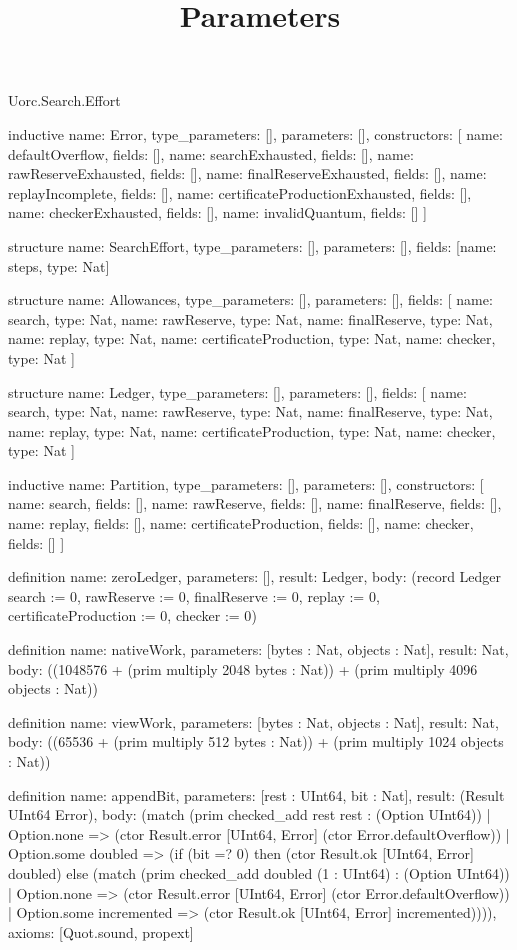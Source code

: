 \begin{lexlean}{Uorc.Search.Effort}
\title{Parameters}
\begin{semanticmodule}
inductive{
  name: Error,
  type_parameters: [],
  parameters: [],
  constructors: [
    {name: defaultOverflow, fields: []},
    {name: searchExhausted, fields: []},
    {name: rawReserveExhausted, fields: []},
    {name: finalReserveExhausted, fields: []},
    {name: replayIncomplete, fields: []},
    {name: certificateProductionExhausted, fields: []},
    {name: checkerExhausted, fields: []},
    {name: invalidQuantum, fields: []}
  ]
}

structure{
  name: SearchEffort,
  type_parameters: [],
  parameters: [],
  fields: [{name: steps, type: Nat}]
}

structure{
  name: Allowances,
  type_parameters: [],
  parameters: [],
  fields: [
    {name: search, type: Nat},
    {name: rawReserve, type: Nat},
    {name: finalReserve, type: Nat},
    {name: replay, type: Nat},
    {name: certificateProduction, type: Nat},
    {name: checker, type: Nat}
  ]
}

structure{
  name: Ledger,
  type_parameters: [],
  parameters: [],
  fields: [
    {name: search, type: Nat},
    {name: rawReserve, type: Nat},
    {name: finalReserve, type: Nat},
    {name: replay, type: Nat},
    {name: certificateProduction, type: Nat},
    {name: checker, type: Nat}
  ]
}

inductive{
  name: Partition,
  type_parameters: [],
  parameters: [],
  constructors: [
    {name: search, fields: []},
    {name: rawReserve, fields: []},
    {name: finalReserve, fields: []},
    {name: replay, fields: []},
    {name: certificateProduction, fields: []},
    {name: checker, fields: []}
  ]
}

definition{
  name: zeroLedger,
  parameters: [],
  result: Ledger,
  body: (record Ledger {search := 0, rawReserve := 0, finalReserve := 0, replay := 0, certificateProduction := 0, checker := 0})
}

definition{
  name: nativeWork,
  parameters: [bytes : Nat, objects : Nat],
  result: Nat,
  body: ((1048576 + (prim multiply 2048 bytes : Nat)) + (prim multiply 4096 objects : Nat))
}

definition{
  name: viewWork,
  parameters: [bytes : Nat, objects : Nat],
  result: Nat,
  body: ((65536 + (prim multiply 512 bytes : Nat)) + (prim multiply 1024 objects : Nat))
}

definition{
  name: appendBit,
  parameters: [rest : UInt64, bit : Nat],
  result: (Result UInt64 Error),
  body: (match (prim checked_add rest rest : (Option UInt64))
    | Option.none => (ctor Result.error [UInt64, Error] (ctor Error.defaultOverflow))
    | Option.some doubled => (if (bit =? 0) then (ctor Result.ok [UInt64, Error] doubled) else (match (prim checked_add doubled (1 : UInt64) : (Option UInt64))
      | Option.none => (ctor Result.error [UInt64, Error] (ctor Error.defaultOverflow))
      | Option.some incremented => (ctor Result.ok [UInt64, Error] incremented)))),
  axioms: [Quot.sound, propext]
}


\end{semanticmodule}
\end{lexlean}

